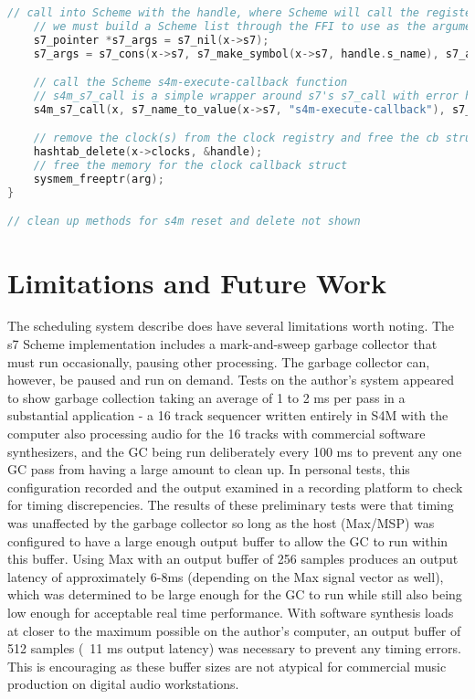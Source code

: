 \documentclass[acmsmall]{acmart}
\begin{document}
\begin{lstlisting}[language=C]
    // call into Scheme with the handle, where Scheme will call the registered delayed function
    // we must build a Scheme list through the FFI to use as the arguments
    s7_pointer *s7_args = s7_nil(x->s7);
    s7_args = s7_cons(x->s7, s7_make_symbol(x->s7, handle.s_name), s7_args); 

    // call the Scheme s4m-execute-callback function
    // s4m_s7_call is a simple wrapper around s7's s7_call with error handling and logging 
    s4m_s7_call(x, s7_name_to_value(x->s7, "s4m-execute-callback"), s7_args);   

    // remove the clock(s) from the clock registry and free the cb struct
    hashtab_delete(x->clocks, &handle);
    // free the memory for the clock callback struct 
    sysmem_freeptr(arg);
}

// clean up methods for s4m reset and delete not shown

\end{lstlisting}

\section{Limitations and Future Work}

The scheduling system describe does have several limitations worth noting.
The s7 Scheme implementation includes a mark-and-sweep garbage collector 
that must run occasionally, pausing other processing. The garbage collector
can, however, be paused and run on demand. Tests on the author's
system appeared to show garbage collection taking an average of 1 to 2 ms per pass
in a substantial application - a 16 track sequencer written entirely in S4M
with the computer also processing audio for the 16 tracks with commercial
software synthesizers, and the GC being run deliberately every 100 ms
to prevent any one GC pass from having a large amount to clean up. 
In personal tests, this configuration recorded and the output
examined in a recording platform to check for timing discrepencies. The
results of these preliminary tests were that timing was unaffected by the 
garbage collector so long as the host (Max/MSP) was configured to have
a large enough output buffer to allow the GC to run within this buffer.
Using Max with an output buffer of 256 samples produces an output latency
of approximately 6-8ms (depending on the Max signal vector as well), which
was determined to be large enough for the GC to run while still also being
low enough for acceptable real time performance. With software synthesis
loads at closer to the maximum possible on the author's computer,
an output buffer of 512 samples (~11 ms output latency) was necessary to prevent
any timing errors. This is encouraging as these buffer sizes are not atypical
for commercial music production on digital audio workstations. 
\end{document}
